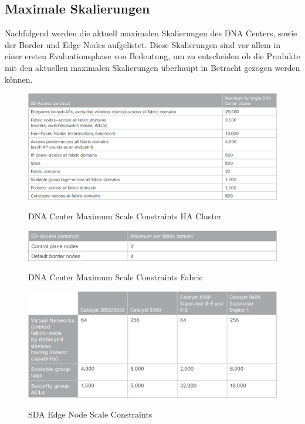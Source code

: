 \subsection{Maximale Skalierungen}
Nachfolgend werden die aktuell maximalen Skalierungen des DNA Centers, sowie der Border und Edge Nodes aufgelistet. Diese Skalierungen sind vor allem in einer ersten Evaluationsphase von Bedeutung, um zu entscheiden ob die Produkte mit den aktuellen maximalen Skalierungen überhaupt in Betracht gezogen werden können. 
\begin{figure}[H]
	\centering
	\includegraphics[width=1\linewidth]{img/MaximumScale-HACluster.png}\\[1px]
	\caption{DNA Center Maximum Scale Constraints HA Cluster \cite{sda-designguide}}
	\label{fig:Maximum Scale HACluster}
\end{figure}


\begin{figure}[H]
	\centering
	\includegraphics[width=1\linewidth]{img/MaximumScale-Fabric.png}\\[1px]
	\caption{DNA Center Maximum Scale Constraints Fabric \cite{sda-designguide}}
	\label{fig:Maximum Scale Fabric}
\end{figure}

\begin{figure}[H]
	\centering
	\includegraphics[width=1\linewidth]{img/MaximumScale-EdgeNode.png}\\[1px]
	\caption{SDA Edge Node Scale Constraints \cite{sda-designguide}}
	\label{fig:SDA Edge Node Scale Constraints}
\end{figure}

